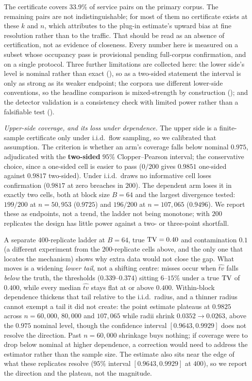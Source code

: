 The certificate covers 33.9\% of service pairs on the primary corpus. The
remaining pairs are not indistinguishable; for most of them no certificate
exists at these $k$ and $n$, which  attributes to the
plug-in estimate's upward bias at fine resolution rather than to the traffic. That should be read as an
absence of certification, not as evidence of closeness. Every number here is
measured on a subset whose occupancy pass is provisional pending full-corpus
confirmation, and on a single protocol. Three further limitations are collected
here: the lower side's level is nominal rather than exact
(), so as a two-sided statement the interval is only as
strong as its weaker endpoint; the corpora use different lower-side conventions,
so the headline comparison is mixed-strength by construction
(); and the detector validation is a consistency
check with limited power rather than a falsifiable test
().

\emph{Upper-side coverage, and its loss under dependence.} The upper side is a
finite-sample certificate only under i.i.d.\ flow sampling, so we calibrated that
assumption. The criterion is whether an arm's coverage falls below nominal
$0.975$, adjudicated with the \textbf{two-sided} $95\%$ Clopper--Pearson interval;
the conservative choice, since a one-sided cell is easier to pass ($0/200$
gives $0.9851$ one-sided against $0.9817$ two-sided). Under i.i.d.\ draws no informative cell loses confirmation
($0.9817$ at zero breaches in $200$). The dependent arm loses it in exactly two
cells, both at block size $B{=}64$ and the largest divergence tested: $199/200$
at $n{=}50{,}953$ ($0.9725$) and $196/200$ at $n{=}107{,}065$ ($0.9496$). We
report these as endpoints, not a trend, the ladder not
being monotone; with $200$ replicates the design has little power against a two-
or three-point shortfall.

A separate $400$-replicate ladder at $B{=}64$, true $\mathrm{TV} = 0.40$ and
contamination $0.1$ (a different experiment from the $200$-replicate cells
above, and the only one that locates the mechanism) shows why extra data would
not close the gap. What moves is a widening \emph{lower tail}, not a shifting
centre: misses occur when $\widehat{tv}$ falls \emph{below} the truth, the
thresholds ($0.339$--$0.374$) sitting $6$--$15\%$ under a true $\mathrm{TV}$ of $0.400$,
while every median $\widehat{tv}$ stays flat at or above $0.400$. Within-block
dependence thickens that tail relative to the i.i.d.\ radius, and a thinner radius
cannot exempt a tail it did not create: the point estimate plateaus at $0.9825$
across $n{=}60{,}000$, $80{,}000$ and $107{,}065$ while radii shrink
$0.0352\to0.0263$, above the $0.975$ nominal level, though the confidence
interval $[0.9643, 0.9929]$ does not resolve the direction. Past $n{=}60{,}000$
shrinkage buys nothing; if coverage were to drop below nominal at higher
dependence, a correction would need to address the estimator rather than the
sample size. The estimate also sits near the edge of what
these replicates resolve ($95\%$ interval $[0.9643, 0.9929]$ at $400$), so we
 report the direction and the plateau, not the magnitude.

